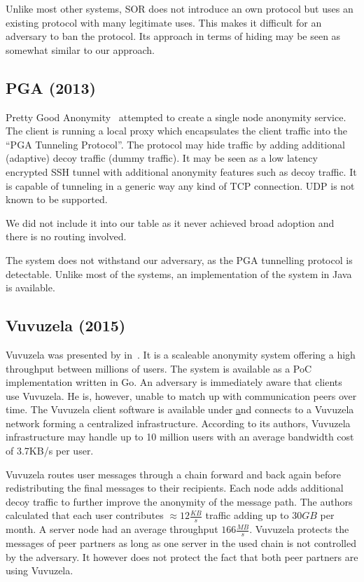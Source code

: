 Unlike most other systems, SOR does not introduce an own protocol but uses an existing protocol with many legitimate uses. This makes it difficult for an adversary to ban the protocol. Its approach in terms of hiding may be seen as somewhat similar to our approach.

\subsection{PGA (2013)}
Pretty Good Anonymity~\cite{standtke2013pretty} attempted to create a single node anonymity service. The client is running a local proxy which encapsulates the client traffic into the ``PGA Tunneling Protocol''. The protocol may hide traffic by adding additional (adaptive) decoy traffic (dummy traffic). It may be seen as a low latency encrypted SSH tunnel with additional anonymity features such as decoy traffic. It is capable of tunneling in a generic way any kind of TCP connection. UDP is not known to be supported.

We did not include it into our table as it never achieved broad adoption and there is no routing involved. 

The system does not withstand our adversary, as the PGA tunnelling protocol is detectable. Unlike most of the systems, an implementation of the system in Java is available.

\subsection{Vuvuzela (2015)}
Vuvuzela was presented by \citeauthor{van2015vuvuzela} in~\cite{van2015vuvuzela}. It is a scaleable anonymity system offering a high throughput between millions of users. The system is available as a PoC implementation written in Go. An adversary is immediately aware that clients use Vuvuzela. He is, however, unable to match up with communication peers over time. The Vuvuzela client software is available under \href{https://vuvuzela.io/} and connects to a Vuvuzela network forming a centralized infrastructure. According to its authors, Vuvuzela infrastructure may handle up to 10 million users with an average bandwidth cost of 3.7KB/s per user.

Vuvuzela routes user messages through a chain forward and back again before redistributing the final messages to their recipients. Each node adds additional decoy traffic to further improve the anonymity of the message path. The authors calculated that each user contributes $\approx 12 \frac{KB}{s}$ traffic adding up to $30 GB$ per month. A server node had an average throughput $166 \frac{MB}{s}$. Vuvuzela protects the messages of peer partners as long as one server in the used chain is not controlled by the adversary. It however does not protect the fact that both peer partners are using Vuvuzela. 

